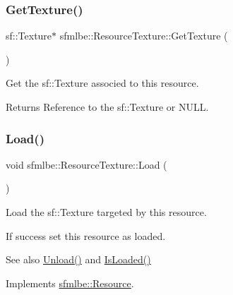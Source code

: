 \subsubsection{\texorpdfstring{Get\+Texture()}{GetTexture()}}
{\footnotesize\ttfamily sf\+::\+Texture$\ast$ sfmlbe\+::\+Resource\+Texture\+::\+Get\+Texture (\begin{DoxyParamCaption}{ }\end{DoxyParamCaption})\hspace{0.3cm}{\ttfamily [inline]}}



Get the sf\+::\+Texture associed to this resource. 

\begin{DoxyReturn}{Returns}
Reference to the sf\+::\+Texture or N\+U\+LL. 
\end{DoxyReturn}
\mbox{\label{classsfmlbe_1_1_resource_texture_a4f8d27c8e50efce6d66a30edb078e2d3}} 
\subsubsection{\texorpdfstring{Load()}{Load()}}
{\footnotesize\ttfamily void sfmlbe\+::\+Resource\+Texture\+::\+Load (\begin{DoxyParamCaption}{ }\end{DoxyParamCaption})\hspace{0.3cm}{\ttfamily [virtual]}}



Load the sf\+::\+Texture targeted by this resource. 

If success set this resource as loaded. \begin{DoxySeeAlso}{See also}
\mbox{\hyperlink{classsfmlbe_1_1_resource_texture_ac8b1b5866242e222abf0385144711646}{Unload()}} and \mbox{\hyperlink{classsfmlbe_1_1_resource_acd0812c81f7d5d851a4671f0cf7bb4f1}{Is\+Loaded()}} 
\end{DoxySeeAlso}


Implements \mbox{\hyperlink{classsfmlbe_1_1_resource_a35981869a1e90ebbf30258ff7aa1d6d2}{sfmlbe\+::\+Resource}}.

\mbox{\label{classsfmlbe_1_1_resource_texture_ac8b1b5866242e222abf0385144711646}} 
